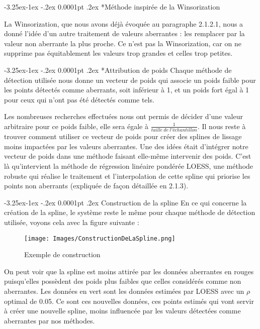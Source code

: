 \documentclass[a4paper,12pt]{article} %
\makeatletter
\renewcommand\paragraph{\@startsection{paragraph}{4}{\z@}%
                                      {-3.25ex\@plus -1ex \@minus -.2ex}%
                                      {0.0001pt \@plus .2ex}%
                                      {\normalfont\normalsize\bfseries}}
\renewcommand\subparagraph{\@startsection{subparagraph}{5}{\z@}%
                                      {-3.25ex\@plus -1ex \@minus -.2ex}%
                                      {0.0001pt \@plus .2ex}%
                                      {\normalfont\normalsize\bfseries}}
\makeatother
\begin{document}
					\subparagraph*{Méthode inspirée de la Winsorization}
					
    					La Winsorization, que nous avons déjà évoquée au paragraphe 2.1.2.1, nous a donné l'idée d'un autre traitement de valeurs aberrantes : les remplacer par la valeur non aberrante la plus proche. Ce n'est pas la Winsorization, car on ne supprime pas équitablement les valeurs trop grandes et celles trop petites.
    					
					\subparagraph*{Attribution de poids}
					    Chaque méthode de détection utilisée nous donne un vecteur de poids qui associe un poids faible pour les points détectés comme aberrants, soit inférieur à 1, et un poids fort égal à 1 pour ceux qui n'ont pas été détectés comme tels.
					    
					    Les nombreuses recherches effectuées nous ont permis de décider d'une valeur arbitraire pour ce poids faible, elle sera égale à $\frac{1}{taille \ de \ l'échantillon}$. Il nous reste à trouver comment utiliser ce vecteur de poids pour créer des splines de lissage moins impactées par les valeurs aberrantes. Une des idées était d'intégrer notre vecteur de poids dans une méthode faisant elle-même intervenir des poids. C'est là qu'intervient la méthode de régression linéaire pondérée LOESS, une méthode robuste qui réalise le traitement et l'interpolation de cette spline qui priorise les points non aberrants (expliquée de façon détaillée en 2.1.3).
				
					    
			    \paragraph{Construction de la spline}
			        En ce qui concerne la création de la spline, le système reste le même pour chaque méthode de détection utilisée, voyons cela avec la figure suivante :
			        
			        \begin{figure}[H]
                        \centering
                        \texttt{[image: Images/ConstructionDeLaSpline.png]}
                        \caption{Exemple de construction}
                        \label{fig:exemple}
                    \end{figure}
                    
                    On peut voir que la spline est moins attirée par les données aberrantes en rouges puisqu'elles possèdent des poids plus faibles que celles considérés comme non aberrantes. Les données en vert sont les données estimées par LOESS avec un $\rho $ optimal de 0.05.  Ce sont ces nouvelles données, ces points estimés qui vont servir à créer une nouvelle spline, moins influencée par les valeurs détectées comme aberrantes par nos méthodes.
			        
\end{document}

